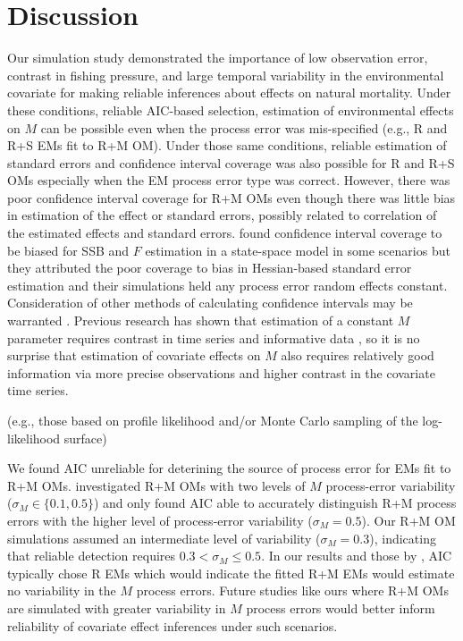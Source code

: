 \documentclass[
  12pt,
]{article}
\begin{document}
\section*{Discussion}\label{discussion}

Our simulation study demonstrated the importance of low observation error, contrast in fishing pressure, and large temporal variability in the environmental covariate for making reliable inferences about effects on natural mortality. Under these conditions, reliable AIC-based selection, estimation of environmental effects on \(M\) can be possible even when the process error was mis-specified (e.g., R and R+S EMs fit to R+M OM). Under those same conditions, reliable estimation of standard errors and confidence interval coverage was also possible for R and R+S OMs especially when the EM process error type was correct. However, there was poor confidence interval coverage for R+M OMs even though there was little bias in estimation of the effect or standard errors, possibly related to correlation of the estimated effects and standard errors. \citet{cadiganetal24} found confidence interval coverage to be biased for SSB and \(F\) estimation in a state-space model in some scenarios but they attributed the poor coverage to bias in Hessian-based standard error estimation and their simulations held any process error random effects constant. Consideration of other methods of calculating confidence intervals may be warranted \citep[e.g.,][]{boykoomeara24}. Previous research has shown that estimation of a constant \(M\) parameter requires contrast in time series and informative data \citep{leeetal11}, so it is no surprise that estimation of covariate effects on \(M\) also requires relatively good information via more precise observations and higher contrast in the covariate time series.

(e.g., those based on profile likelihood and/or Monte Carlo sampling of the log-likelihood surface)

We found AIC unreliable for deterining the source of process error for EMs fit to R+M OMs. \citet{milleretal_inreview1} investigated R+M OMs with two levels of \(M\) process-error variability (\(\sigma_M \in \{0.1,0.5\}\)) and only found AIC able to accurately distinguish R+M process errors with the higher level of process-error variability (\(\sigma_M = 0.5\)). Our R+M OM simulations assumed an intermediate level of variability (\(\sigma_M = 0.3\)), indicating that reliable detection requires \(0.3<\sigma_M\leq0.5\). In our results and those by \citet{milleretal_inreview1}, AIC typically chose R EMs which would indicate the fitted R+M EMs would estimate no variability in the \(M\) process errors. Future studies like ours where R+M OMs are simulated with greater variability in \(M\) process errors would better inform reliability of covariate effect inferences under such scenarios.
\end{document}
